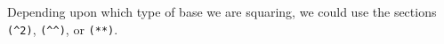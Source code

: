 
Depending upon which type of base we are squaring, we could use the sections
\verb|(^2)|, \verb|(^^)|, or \verb|(**)|.
